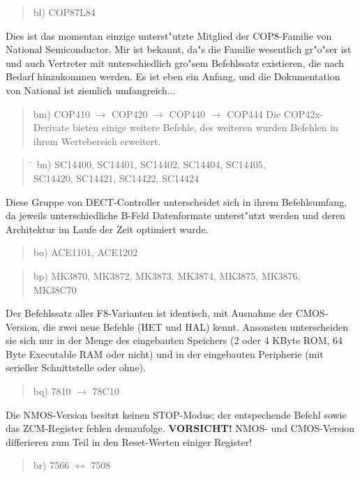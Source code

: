 \documentclass[12pt,a4paper,twoside]{report}
\newcommand{\bb}[1]{{\bf #1}}
\begin{document}
\begin{quote}
bl) COP87L84
\end{quote}
Dies ist das momentan einzige unterst"utzte Mitglied der COP8-Familie
von National Semiconductor.  Mir ist bekannt, da"s die Familie
wesentlich gr"o"ser ist und auch Vertreter mit unterschiedlich gro"sem
Befehlssatz existieren, die nach Bedarf hinzukommen werden.  Es ist eben
ein Anfang, und die Dokumentation von National ist ziemlich umfangreich...
\begin{quote}
bm) COP410 $\rightarrow$ COP420 $\rightarrow$ COP440 $\rightarrow$ COP444
Die COP42x-Derivate bieten einige weitere Befehle, des weiteren wurden
Befehlen in ihrem Wertebereich erweitert.
\end{quote}
\begin{quote}
\begin{tabbing}
\hspace{0.7cm} \= \kill
bn) \> SC14400, SC14401, SC14402, SC14404, SC14405, \\
    \> SC14420, SC14421, SC14422, SC14424 \\
\end{tabbing}
\end{quote}
Diese Gruppe von DECT-Controller unterscheidet sich in ihrem
Befehlsumfang, da jeweils unterschiedliche B-Feld Datenformate
unterst"utzt werden und deren Architektur im Laufe der Zeit optimiert
wurde.
\begin{quote}
bo) ACE1101, ACE1202
\end{quote}
\begin{quote}
bp) MK3870, MK3872, MK3873, MK3874, MK3875, MK3876, \\
    MK38C70
\end{quote}
Der Befehlssatz aller F8-Varianten ist identisch, mit Ausnahme
der CMOS-Version, die zwei neue Befehle (HET und HAL) kennt.
Ansonsten unterscheiden sie sich nur in der Menge des eingebauten
Speichers (2 oder 4 KByte ROM, 64 Byte Executable RAM oder nicht)
und in der eingebauten Peripherie (mit serieller Schnittstelle
oder ohne).
\begin{quote}
bq) 7810 $\rightarrow$ 78C10
\end{quote}
Die NMOS-Version besitzt keinen STOP-Modus; der entspechende Befehl sowie
das ZCM-Register fehlen demzufolge.  \bb{VORSICHT!} NMOS- und CMOS-Version
differieren zum Teil in den Reset-Werten einiger Register!
\begin{quote}
br) 7566 $\leftrightarrow$ 7508
\end{quote}
\end{document}
